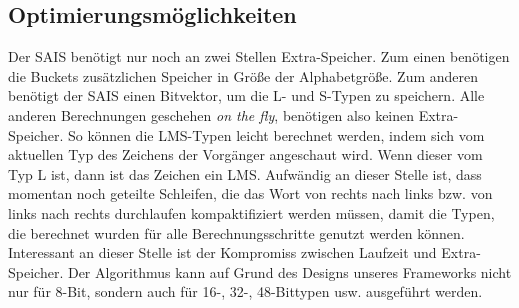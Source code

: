\subsection{Optimierungsmöglichkeiten}
Der SAIS benötigt nur noch an zwei Stellen Extra-Speicher. Zum einen benötigen die Buckets zusätzlichen Speicher in Größe der Alphabetgröße. Zum anderen benötigt der SAIS einen Bitvektor, um die L- und S-Typen zu speichern. Alle anderen Berechnungen geschehen \textit{on the fly}, benötigen also keinen Extra-Speicher. So können die LMS-Typen leicht berechnet werden, indem sich vom aktuellen Typ des Zeichens der Vorgänger angeschaut wird. Wenn dieser vom Typ L ist, dann ist das Zeichen ein LMS. Aufwändig an dieser Stelle ist, dass momentan noch geteilte Schleifen, die das Wort von rechts nach links bzw. von links nach rechts durchlaufen kompaktifiziert werden müssen, damit die Typen, die berechnet wurden für alle Berechnungsschritte genutzt werden können. Interessant an dieser Stelle ist der Kompromiss zwischen Laufzeit und Extra-Speicher. Der Algorithmus kann auf Grund des Designs unseres Frameworks nicht nur für 8-Bit, sondern auch für 16-, 32-, 48-Bittypen usw. ausgeführt werden.

\newpage































